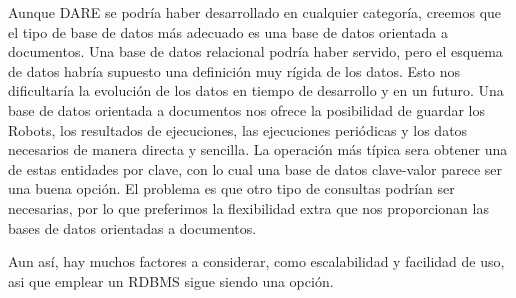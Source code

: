 Aunque DARE se podría haber desarrollado en cualquier categoría,
creemos que el tipo de base de datos más adecuado es una base de datos
orientada a documentos. Una base de datos relacional podría haber
servido, pero el esquema de datos habría supuesto una definición muy
rígida de los datos. Esto nos dificultaría la evolución de los datos
en tiempo de desarrollo y en un futuro. Una base de datos orientada a
documentos nos ofrece la posibilidad de guardar los Robots, los
resultados de ejecuciones, las ejecuciones periódicas y los datos
necesarios de manera directa y sencilla. La operación más típica sera
obtener una de estas entidades por clave, con lo cual una base de
datos clave-valor parece ser una buena opción. El problema es que otro
tipo de consultas podrían ser necesarias, por lo que preferimos la
flexibilidad extra que nos proporcionan las bases de datos orientadas
a documentos.

Aun así, hay muchos factores a considerar, como escalabilidad y
facilidad de uso, asi que emplear un RDBMS sigue siendo una opción.

